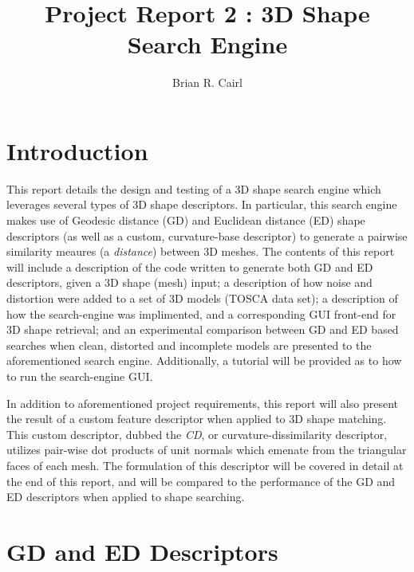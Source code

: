 \documentclass[12pt]{article}
\title{Project Report 2 : 3D Shape Search Engine}
\author{Brian R. Cairl}
\begin{document}
\maketitle
\pagebreak

\newcommand{\ith}{i$^{th}$\hspace{0.5mm}}
\newcommand{\jth}{j$^{th}$\hspace{0.5mm}}
\newcommand{\st}{\hspace{0.5mm}:\hspace{0.5mm}}
\newcommand{\fa}{\hspace{0.5mm}\forall\hspace{0.5mm}}


\section*{Introduction}

	\noindent	
	This report details the design and testing of a 3D shape search engine which leverages several types of 3D shape descriptors. In particular, this search engine makes use of Geodesic distance (GD) and Euclidean distance (ED) shape descriptors (as well as a custom, curvature-base descriptor) to generate a pairwise similarity meaures (a \emph{distance}) between 3D meshes. The contents of this report will include a description of the code written to generate both GD and ED descriptors, given a 3D shape (mesh) input; a description of how noise and distortion were added to a set of 3D models (TOSCA data set); a description of how the search-engine was implimented, and a corresponding GUI front-end for 3D shape retrieval; and an experimental comparison between GD and ED based searches when clean, distorted and incomplete models are presented to the aforementioned search engine. Additionally, a tutorial will be provided as to how to run the search-engine GUI.

	\noindent	
	In addition to aforementioned project requirements, this report will also present the result of a custom feature descriptor when applied to 3D shape matching. This custom descriptor, dubbed the \emph{CD}, or curvature-dissimilarity descriptor, utilizes pair-wise dot products of unit normals which emenate from the triangular faces of each mesh. The formulation of this descriptor will be covered in detail at the end of this report, and will be compared to the performance of the GD and ED descriptors when applied to shape searching.


\section*{GD and ED Descriptors}
	
\end{document}
